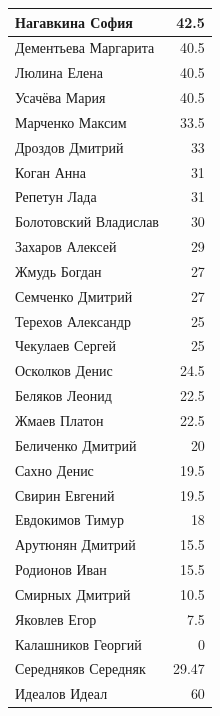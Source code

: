 \documentclass[12pt]{article}
\newlength{\h}
\begin{document}
\begin{table}[ht]
\begin{minipage}[t]{0.48\linewidth}
\begin{tabular}{|l|r|}
      \hline
      Нагавкина София        &   42.5  \\
      \hline
      Дементьева Маргарита   &   40.5  \\
      \hline
      Люлина Елена           &   40.5  \\
      \hline
      Усачёва Мария          &   40.5  \\
      \hline
      Марченко Максим        &   33.5  \\
      \hline
      Дроздов Дмитрий        &    33  \\
      \hline
      Коган Анна             &    31  \\
      \hline
      Репетун Лада           &    31  \\
      \hline
      Болотовский Владислав  &    30  \\
      \hline
      Захаров Алексей        &    29  \\
      \hline
      Жмудь Богдан           &     27  \\
      \hline
      Семченко Дмитрий       &     27  \\
      \hline
      Терехов Александр      &    25  \\
      \hline
      Чекулаев Сергей        &    25  \\
      \hline
      Осколков Денис         &   24.5  \\
      \hline
      Беляков Леонид         &   22.5  \\
      \hline
      Жмаев Платон           &   22.5  \\
      \hline
      Беличенко Дмитрий      &    20  \\
      \hline
      Сахно Денис            &   19.5  \\
      \hline
      Свирин Евгений         &   19.5  \\
      \hline
      Евдокимов Тимур        &    18  \\
      \hline
      Арутюнян Дмитрий       &   15.5  \\
      \hline
      Родионов Иван          &   15.5  \\
      \hline
      Смирных Дмитрий        &   10.5  \\
      \hline
      Яковлев Егор           &    7.5  \\
      \hline
      Калашников Георгий     &      0  \\
      \hline
      Середняков Середняк    &  29.47  \\
      Идеалов Идеал          &     60  \\
      \hline
    \end{tabular}
  \end{minipage}
\end{table}
\end{document}
